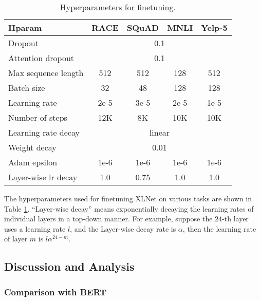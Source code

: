 \documentclass{article}
\begin{document}
\begin{table}[h!]
  \small
  \centering
  
  \begin{tabular}{lcccc}
    \toprule
    \bf Hparam & \bf RACE & \bf SQuAD & \bf MNLI & \bf Yelp-5 \\
    \midrule
    Dropout             & \multicolumn{4}{c}{0.1}    \\
    Attention dropout   & \multicolumn{4}{c}{0.1}    \\
    Max sequence length & 512  & 512  & 128  & 512   \\
    Batch size          & 32   & 48   & 128  & 128   \\
    Learning rate       & 2e-5 & 3e-5 & 2e-5 & 1e-5  \\
    Number of steps     & 12K  & 8K   & 10K  & 10K   \\
    Learning rate decay & \multicolumn{4}{c}{linear} \\
    Weight decay        & \multicolumn{4}{c}{0.01}   \\
    Adam epsilon        & 1e-6 & 1e-6 & 1e-6 & 1e-6  \\
    Layer-wise lr decay & 1.0  & 0.75 & 1.0  & 1.0   \\
    \bottomrule
  \end{tabular}
  \caption{\small
    Hyperparameters for finetuning.
  }
  \label{tab:hp-finetune}
  \vspace{-1em}
\end{table}

The hyperparameters used for finetuning XLNet on various tasks are shown in Table \ref{tab:hp-finetune}. ``Layer-wise decay'' means exponentially decaying the learning rates of individual layers in a top-down manner. For example, suppose the $24$-th layer uses a learning rate $l$, and the Layer-wise decay rate is $\alpha$, then the learning rate of layer $m$ is $l \alpha^{24 - m}$.


\subsection{Discussion and Analysis}
\label{sec:discussion}
\subsubsection{Comparison with BERT}
\label{sec:compare-bert}
\end{document}

